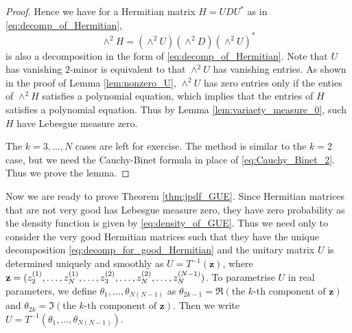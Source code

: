 \documentclass[11pt, a4paper]{article}
\numberwithin{equation}{section}
\renewcommand{\vec}[1]{\mathbf{#1}}
\theoremstyle{definition}
\theoremstyle{remark}
\begin{document}
\begin{proof}
  Hence we have for a Hermitian matrix $H = U D U^*$ as in \eqref{eq:decomp_of_Hermitian},
  \begin{equation}
    \wedge^2 H = (\wedge^2 U) (\wedge^2 D) (\wedge^2 U)^*
  \end{equation}
  is also a decomposition in the form of \eqref{eq:decomp_of_Hermitian}. Note that $U$ has vanishing $2$-minor is equivalent to that $\wedge^2 U$ has vanishing entries. As shown in the proof of Lemma \eqref{lem:nonzero_U}, $\wedge^2 U$ has zero entries only if the enties of $\wedge^2 H$ satisfies a polynomial equation, which implies that the entries of $H$ satisfies a polynomial equation. Thus by Lemma \eqref{lem:variaety_measure_0}, such $H$ have Lebesgue measure zero.

  The $k = 3, \dotsc, N$ cases are left for exercise. The method is similar to the $k = 2$ case, but we need the Cauchy-Binet formula \cite[Section 0.8.7]{Horn-Johnson90} in place of \eqref{eq:Cauchy_Binet_2}. Thus we prove the lemma.
\end{proof}

Now we are ready to prove Theorem \ref{thm:jpdf_GUE}. Since Hermitian matrices that are not very good has Lebesgue measure zero, they have zero probability as the density function is given by \eqref{eq:density_of_GUE}. Thus we need only to consider the very good Hermitian matrices such that they have the unique decomposition \eqref{eq:decomp_for_good_Hermitian} and the unitary matrix $U$ is determined uniquely and smoothly as $U = T^{-1}(\vec{z})$, where $\vec{z} = (z^{(1)}_2, \dotsc, \linebreak[0] z^{(1)}_N, \dotsc, \linebreak[0] z^{(2)}_3, \dotsc, \linebreak[0] z^{(2)}_N, \dotsc, \linebreak[0] z^{(N - 1)}_N)$. To parametrise $U$ in real parameters, we define $\theta_1, \dotsc, \theta_{N(N - 1)}$ as $\theta_{2k-1} = \Re(\text{the $k$-th component of $\vec{z}$})$ and $\theta_{2k} = \Im(\text{the $k$-th component of $\vec{z}$})$. Then we write $U = T^{-1}(\theta_1, \dotsc, \theta_{N(N - 1)})$.
\end{document}
